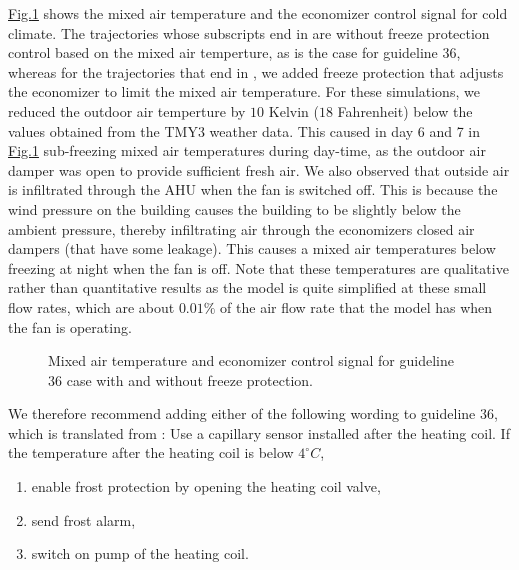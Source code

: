 \documentclass[letterpaper,10pt, openany,english]{sphinxmanual}
\begin{document}
\hyperref[\detokenize{example:fig-fre-pro}]{Fig.\@ \ref{\detokenize{example:fig-fre-pro}}} shows the mixed air temperature and the economizer control
signal for cold climate.
The trajectories whose subscripts end in  are without freeze protection control based
on the mixed air temperture, as is the case for guideline 36,
whereas for the trajectories that end in , we added freeze
protection that adjusts the economizer to limit the mixed air temperature.
For these simulations, we reduced the outdoor air temperture by
\(10\) Kelvin (\(18\) Fahrenheit) below the values obtained from the TMY3 weather data.
This caused in day 6 and 7 in \hyperref[\detokenize{example:fig-fre-pro}]{Fig.\@ \ref{\detokenize{example:fig-fre-pro}}} sub-freezing mixed air temperatures
during day-time, as the outdoor air damper was open to provide sufficient fresh air.
We also observed that outside air is infiltrated through the AHU when the fan
is switched off.
This is because
the wind pressure on the building causes the building to be slightly below
the ambient pressure, thereby infiltrating air through the economizers closed
air dampers (that have some leakage).
This causes a mixed air temperatures below freezing at night when the fan is off.
Note that these temperatures are qualitative rather than quantitative results
as the model is quite simplified at these small flow rates, which are about
\(0.01\%\) of the air flow rate that the model has when the fan is operating.

\begin{figure}[htbp]
\centering
\capstart

\noindent{}
\caption{Mixed air temperature and economizer control signal for guideline 36 case with
and without freeze protection.}\label{\detokenize{example:id32}}\label{\detokenize{example:fig-fre-pro}}\end{figure}

We therefore recommend adding either of the following wording to guideline 36,
which is translated from :
Use a capillary sensor installed after the heating coil. If the temperature after the heating coil is below
\(4^\circ C\),
\begin{enumerate}
\def\theenumi{\arabic{enumi}}
\def\labelenumi{\theenumi .}
\makeatletter\def\p@enumii{\p@enumi \theenumi .}\makeatother
\item {} 
enable frost protection by opening the heating coil valve,

\item {} 
send frost alarm,

\item {} 
switch on pump of the heating coil.

\end{enumerate}
\end{document}
